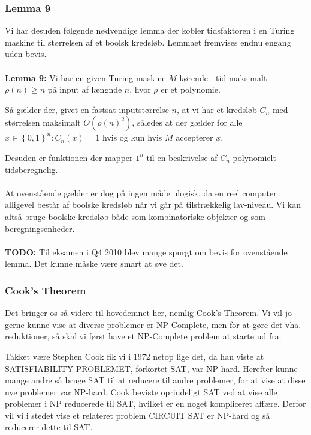 \subsubsection{Lemma 9}

Vi har desuden følgende nødvendige lemma der kobler tidsfaktoren i en Turing maskine til størrelsen af et boolsk kredsløb. Lemmaet fremvises endnu engang uden bevis.\\
~\\
\textbf{Lemma 9:} Vi har en given Turing maskine $M$ kørende i tid maksimalt $\rho(n) \geq n$ på input af længnde $n$, hvor $\rho$ er et polynomie.

Så gælder der, givet en fastsat inputstørrelse $n$, at vi har et kredsløb $C_n$ med størrelsen maksimalt $O(\rho(n)^2)$, således at der gælder for alle $x \in \left\lbrace 0,1 \right\rbrace^n: C_n(x) = 1$ hvis og kun hvis $M$ accepterer $x$.

Desuden er funktionen der mapper $1^n$ til en beskrivelse af $C_n$ polynomielt tidsberegnelig.\\
~\\
At ovenstående gælder er dog på ingen måde ulogisk, da en reel computer alligevel består af boolske kredsløb når vi går på tilstrækkelig lav-niveau. Vi kan altså bruge boolske kredsløb både som kombinatoriske objekter og som beregningsenheder. \\
~\\
\textbf{TODO: } Til eksamen i Q4 2010 blev mange spurgt om bevis for ovenstående lemma. Det kunne måske være smart at øve det.

\subsubsection{Cook's Theorem}

Det bringer os så videre til hovedemnet her, nemlig Cook's Theorem. Vi vil jo gerne kunne vise at diverse problemer er NP-Complete, men for at gøre det vha. reduktioner, så skal vi først have et NP-Complete problem at starte ud fra.

Takket være Stephen Cook fik vi i 1972 netop lige det, da han viste at SATISFIABILITY PROBLEMET, forkortet SAT, var NP-hard. Herefter kunne mange andre så bruge SAT til at reducere til andre problemer, for at vise at disse nye problemer var NP-hard. Cook beviste oprindeligt SAT ved at vise alle problemer i NP reducerede til SAT, hvilket er en noget kompliceret affære. Derfor vil vi i stedet vise et relateret problem CIRCUIT SAT er NP-hard og så reducerer dette til SAT.

